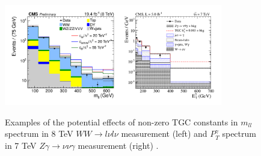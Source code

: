 \begin{figure}[htb]
  \begin{center}
    {\includegraphics[width=0.85\textwidth]{../figs/WgAbout/aTGC_Pt_Examples.png}}
    \caption{Examples of the potential effects of non-zero TGC constants in $m_{ll}$ spectrum in 8 TeV $WW \rightarrow l\nu l\nu$ measurement (left) \cite{ref_CMS_8TeV_WW} and $P_T^{\gamma}$ spectrum in 7 TeV $Z\gamma \rightarrow \nu\nu\gamma$ measurement (right) \cite{ref_CMS_7TeV_Zgnunug}.}
    \label{fig:aTGC_Pt_Examples}
  \end{center}
\end{figure}



